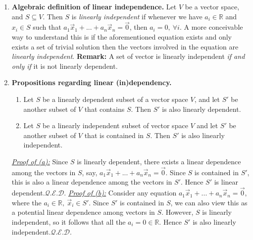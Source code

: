 \documentclass[oneside, 12pt]{book}
\newcommand{\settag}[1]{\renewcommand{\theenumi}{#1}}
\newcommand{\R}{\mathbb{R}}
\newcommand{\qed}{\hfill $\mathcal{Q}.\mathcal{E}.\mathcal{D}.$}
\newcommand{\tbf}[1]{\textbf{#1}}
\newcommand{\tit}[1]{\textit{#1}}
\begin{document}
\begin{enumerate}
        \settag{1.4.4}
        \item \textbf{Algebraic definition of linear independence.} Let $V$ be a vector space, and $S\subseteq V$. Then $S$ is \textit{linearly independent} if whenever we have $a_i\in \R$ and $x_i\in S$ such that $a_1\vec{x}_1+...+a_n\vec{x}_n = \vec{0}$, then $a_i = 0,~\forall i$. A more conceivable way to understand this is if the aforementioned equation exists and only exists a set of trivial solution then the vectors involved in the equation are \textit{linearly independent}. \newline \tbf{Remark: }A set of vector is linearly independent \tit{if and only if} it is not linearly dependent.
        
        \settag{1.4.7}
        \item \textbf{Propositions regarding linear (in)dependency.}
            \begin{enumerate}
                \item Let $S$ be a linearly dependent subset of a vector space $V$, and let $S'$ be another subset of $V$ that contains $S$. Then $S'$ is also linearly dependent.
                \item Let $S$ be a linearly independent subset of vector space $V$ and let $S'$ be another subset of $V$ that is contained in $S$. Then $S'$ is also linearly independent.
            \end{enumerate}
        \underline{\tit{Proof of (a):}}
        Since $S$ is linearly dependent, there exists a linear dependence among the vectors in $S$, say, $a_1\vec{x}_1 + ...+ a_n\vec{x}_n = \vec{0}$. Since $S$ is contained in $S'$, this is also a linear dependence among the vectors in $S'$. Hence $S'$ is linear dependent.\qed\newline
        \underline{\tit{Proof of (b):}}
        Consider any equation $a_1\vec{x}_1 + ...+ a_n\vec{x}_n = \vec{0}$, where the $a_i \in \R,~\vec{x}_i \in S'$. Since $S'$ is contained in $S$, we can also view this as a potential linear dependence among vectors in $S$. However, $S$ is linearly independent, so it follows that all the $a_i = 0\in \R$. Hence $S'$ is also linearly independent.\qed
    \end{enumerate}
    
\end{document}
